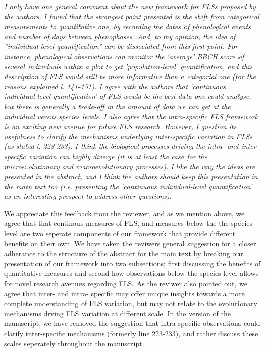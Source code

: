 \documentclass{article}[11pt]
\begin{document}
{{\emph{I only have one general comment about the new framework for FLSs proposed by the authors. I found that the strongest point presented is the shift from categorical measurements to quantitative one, by recording the dates of phenological events and number of days between phenophases. And, to my opinion, the idea of ''individual-level quantification" can be dissociated from this first point. For instance, phenological observations can monitor the ‘average’ BBCH score of several individuals within a plot to get 'population-level' quantification, and this description of FLS would still be more informative than a categorial one (for the reasons explained l. 141-151). I agree with the authors that ‘continuous individual-level quantification’ of FLS would be the best data one could analyse, but there is generally a trade-off in the amount of data we can get at the individual versus species levels. I also agree that the intra-specific FLS framework is an exciting new avenue for future FLS research. However, I question its usefulness to clarify the mechanisms underlying inter-specific variation in FLSs (as stated l. 223-233). I think the biological processes driving the intra- and inter-specific variation can highly diverge (it is at least the case for the microevolutionary and macroevolutionary processes). I like the way the ideas are presented in the abstract, and I think the authors should keep this presentation in the main text too (i.e. presenting the ‘continuous individual-level quantification’ as an interesting prospect to address other questions).}

\noident We appreciate this feedback from the reviewer, and as we mention above, we agree that that continous measures of FLS, and measures below the the species level are two seperate components of our framework that provide different benefits on their own. We have taken the reviwers general suggestion for a closer adherance to the structure of the abstract for the main text by breaking our presentation of our framework into two subsections; first discussing the benefits of quantitative measures and second how observations below the species level allows for novel research avenues regarding FLS. As the reviwer also pointed out, we agree that inter- and intra- specific may offer unique insights towards a more complete understanding of FLS variation, but may not relate to the evolutionary mechanisms drving FLS variation at different scale. In the version of the manuscript, we have removed the suggestion that intra-specific observations could clarify inter-specific mechanisms (formerly line 223-233), and rather discuss these scales seperately throughout the manuscript.\\



}}
\end{document}
